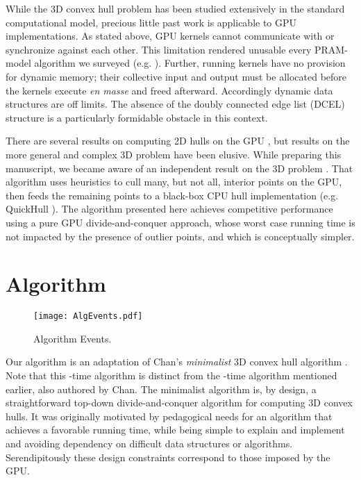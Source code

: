 \documentclass{article}
\begin{document}
While the 3D convex hull problem has been studied extensively in the standard computational model, precious little past work is applicable to GPU implementations. As stated above, GPU kernels cannot communicate with or synchronize against each other. This limitation rendered unusable every PRAM-model algorithm we surveyed (e.g. \cite{pram_alg}). Further, running kernels have no provision for dynamic memory; their collective input and output must be allocated before the kernels execute \emph{en masse} and freed afterward. Accordingly dynamic data structures are off limits. The absence of the doubly connected edge list (DCEL) structure is a particularly formidable obstacle in this context.

There are several results on computing 2D hulls on the GPU  \cite{JurkiewiczDanilewski2011} \cite{ro08cuda} \cite{5763404}, but results on the more general and complex 3D problem have been elusive. While preparing this manuscript, we became aware of an independent result on the 3D problem \cite{ghull}. That algorithm uses heuristics to cull many, but not all, interior points on the GPU, then feeds the remaining points to a black-box CPU hull implementation (e.g. QuickHull \cite{Barber:1996:QAC:235815.235821}). The algorithm presented here achieves competitive performance using a pure GPU divide-and-conquer approach, whose worst case running time is not impacted by the presence of outlier points, and which is conceptually simpler.

\section{Algorithm}

\begin{figure}
\centering
\texttt{[image: AlgEvents.pdf]}
\caption{Algorithm Events.}
\label{algorithm_events}
\end{figure}

Our algorithm is an adaptation of Chan's \emph{minimalist} 3D convex hull algorithm \cite{chan_minimalist}. Note that this -time algorithm is distinct from the -time algorithm mentioned earlier, also authored by Chan. The minimalist algorithm is, by design, a straightforward top-down divide-and-conquer algorithm for computing 3D convex hulls. It was originally motivated by pedagogical needs for an algorithm that achieves a favorable  running time, while being simple to explain and implement and avoiding dependency on difficult data structures or algorithms. Serendipitously these design constraints correspond to those imposed by the GPU.
\end{document}
